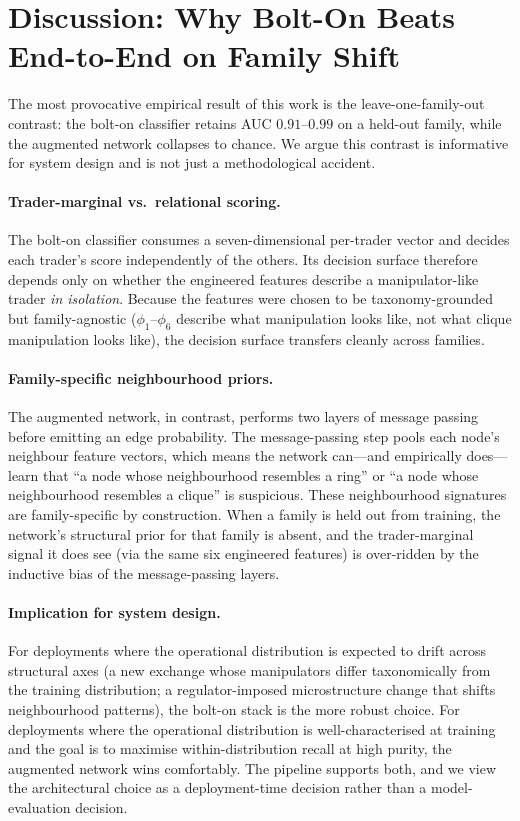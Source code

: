 \documentclass[10pt,twocolumn,letterpaper]{article}
\begin{document}
\section{Discussion: Why Bolt-On Beats End-to-End on Family Shift}
\label{sec:disc}

The most provocative empirical result of this work is the
leave-one-family-out contrast: the bolt-on classifier retains AUC
\(0.91\)--\(0.99\) on a held-out family, while the augmented network
collapses to chance. We argue this contrast is informative for system
design and is not just a methodological accident.

\paragraph{Trader-marginal vs.\ relational scoring.} The bolt-on
classifier consumes a seven-dimensional per-trader vector and decides
each trader's score independently of the others. Its decision surface
therefore depends only on whether the engineered features describe a
manipulator-like trader \emph{in isolation}. Because the features were
chosen to be taxonomy-grounded but family-agnostic
(\(\phi_1\)--\(\phi_6\) describe what manipulation looks like, not what
clique manipulation looks like), the decision surface transfers cleanly
across families.

\paragraph{Family-specific neighbourhood priors.} The augmented network,
in contrast, performs two layers of message passing before emitting an
edge probability. The message-passing step pools each node's neighbour
feature vectors, which means the network can---and empirically does---learn
that ``a node whose neighbourhood resembles a ring''
or ``a node whose neighbourhood resembles a clique'' is suspicious.
These neighbourhood signatures are family-specific by construction. When
a family is held out from training, the network's structural prior for
that family is absent, and the trader-marginal signal it does see (via
the same six engineered features) is over-ridden by the inductive bias
of the message-passing layers.

\paragraph{Implication for system design.} For deployments where the
operational distribution is expected to drift across structural axes
(a new exchange whose manipulators differ taxonomically from the
training distribution; a regulator-imposed microstructure change that
shifts neighbourhood patterns), the bolt-on stack is the more robust
choice. For deployments where the operational distribution is
well-characterised at training and the goal is to maximise
within-distribution recall at high purity, the augmented network wins
comfortably. The pipeline supports both, and we view the architectural
choice as a deployment-time decision rather than a model-evaluation
decision.
\end{document}
